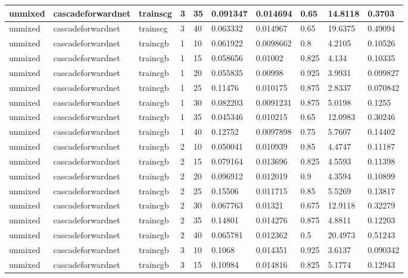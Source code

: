 \begin{longtable}{lllllllll}
unmixed & cascadeforwardnet & trainscg & 3 & 35 & 0.091347 & 0.014694 & 0.65 & 14.8118 & 0.3703 \\ \hline 
unmixed & cascadeforwardnet & trainscg & 3 & 40 & 0.063332 & 0.014967 & 0.65 & 19.6375 & 0.49094 \\ \hline 
unmixed & cascadeforwardnet & traincgb & 1 & 10 & 0.061922 & 0.0098662 & 0.8 & 4.2105 & 0.10526 \\ \hline 
unmixed & cascadeforwardnet & traincgb & 1 & 15 & 0.058656 & 0.01002 & 0.825 & 4.134 & 0.10335 \\ \hline 
unmixed & cascadeforwardnet & traincgb & 1 & 20 & 0.055835 & 0.00998 & 0.925 & 3.9931 & 0.099827 \\ \hline 
unmixed & cascadeforwardnet & traincgb & 1 & 25 & 0.11476 & 0.010175 & 0.875 & 2.8337 & 0.070842 \\ \hline 
unmixed & cascadeforwardnet & traincgb & 1 & 30 & 0.082203 & 0.0091231 & 0.875 & 5.0198 & 0.1255 \\ \hline 
unmixed & cascadeforwardnet & traincgb & 1 & 35 & 0.045346 & 0.010215 & 0.65 & 12.0983 & 0.30246 \\ \hline 
unmixed & cascadeforwardnet & traincgb & 1 & 40 & 0.12752 & 0.0097898 & 0.75 & 5.7607 & 0.14402 \\ \hline 
unmixed & cascadeforwardnet & traincgb & 2 & 10 & 0.050041 & 0.010939 & 0.85 & 4.4747 & 0.11187 \\ \hline 
unmixed & cascadeforwardnet & traincgb & 2 & 15 & 0.079164 & 0.013696 & 0.825 & 4.5593 & 0.11398 \\ \hline 
unmixed & cascadeforwardnet & traincgb & 2 & 20 & 0.096912 & 0.012019 & 0.9 & 4.3594 & 0.10899 \\ \hline 
unmixed & cascadeforwardnet & traincgb & 2 & 25 & 0.15506 & 0.011715 & 0.85 & 5.5269 & 0.13817 \\ \hline 
unmixed & cascadeforwardnet & traincgb & 2 & 30 & 0.067763 & 0.01321 & 0.675 & 12.9118 & 0.32279 \\ \hline 
unmixed & cascadeforwardnet & traincgb & 2 & 35 & 0.14801 & 0.014276 & 0.875 & 4.8811 & 0.12203 \\ \hline 
unmixed & cascadeforwardnet & traincgb & 2 & 40 & 0.065781 & 0.012362 & 0.5 & 20.4973 & 0.51243 \\ \hline 
unmixed & cascadeforwardnet & traincgb & 3 & 10 & 0.1068 & 0.014351 & 0.925 & 3.6137 & 0.090342 \\ \hline 
unmixed & cascadeforwardnet & traincgb & 3 & 15 & 0.10984 & 0.014816 & 0.825 & 5.1774 & 0.12943 \\ \hline 

\end{longtable}
